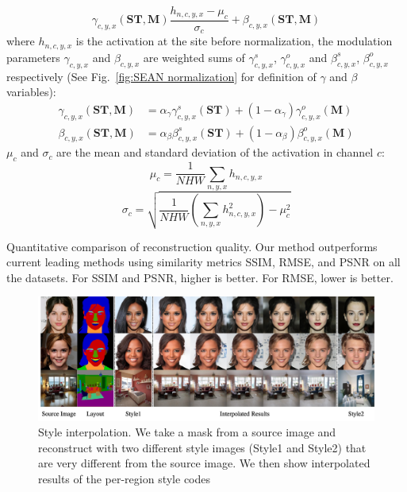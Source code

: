 \documentclass[10pt,twocolumn,letterpaper]{article}
\begin{document}
\begin{equation}
\gamma_{c, y, x}(\mathbf{ST,M}) \frac{h_{n, c, y, x}-\mu_{c}}{\sigma_{c}}+\beta_{c, y, x}(\mathbf{ST,M})
\label{eq:activation value}
\end{equation}
where $h_{n, c, y, x}$ is the activation at the site before normalization, the modulation parameters $\gamma_{c, y, x}$ and $\beta_{c, y, x}$ are weighted sums of $\gamma_{c, y, x}^{s}$, $\gamma_{c, y, x}^{o}$ and $\beta_{c, y, x}^{s}$, $\beta_{c, y, x}^{o}$ respectively (See Fig.~\ref{fig:SEAN normalization} for definition of $\gamma$ and $\beta$ variables):
\begin {equation}
\begin{split}
\gamma_{c, y, x}(\mathbf{ST,M}) &= \alpha_{\gamma}\gamma_{c, y, x}^{s}(\mathbf{ST}) + (1-\alpha_{\gamma}) \gamma_{c, y, x}^{o}(\mathbf{M})\\
\beta_{c, y, x}(\mathbf{ST,M}) &= \alpha_{\beta}\beta_{c, y, x}^{s}(\mathbf{ST}) + (1-\alpha_{\beta}) \beta_{c, y, x}^{o}(\mathbf{M})
\label{eq: gamma beta calculation}
\end{split}
\end{equation}
$\mu_{c}$ and $\sigma_{c}$ are the mean and standard deviation of the activation in channel $c$:
\begin{equation}
\mu_{c}=\frac{1}{N H W} \sum_{n, y, x} h_{n, c, y, x}
\label{eq:mu equation}
\end{equation}
\begin{equation}
\sigma_{c}=\sqrt{ \frac{1}{N H W} \left(\sum_{n, y, x}h_{n, c, y, x}^{2}\right) -\mu_{c}^{2}}
\label{eq:sigma equation}
\end{equation}


\begin{table}[thpb]

\caption{Quantitative comparison of reconstruction quality. Our method outperforms current leading methods using similarity metrics SSIM, RMSE, and PSNR on all the datasets. For SSIM and PSNR, higher is better. For RMSE, lower is better.} 
\label{tab:similarity quantitative table}
\end{table}


\begin{figure}[th]
\centering
\includegraphics[width=\linewidth]{Figures/Interpolation2.jpg}
\vspace*{-7mm}
\caption{Style interpolation. We take a mask from a source image and reconstruct with two different style images (Style1 and Style2) that are very different from the source image. We then show interpolated results of the per-region style codes }
\label{fig:style interpolation}
\end{figure}
\end{document}
